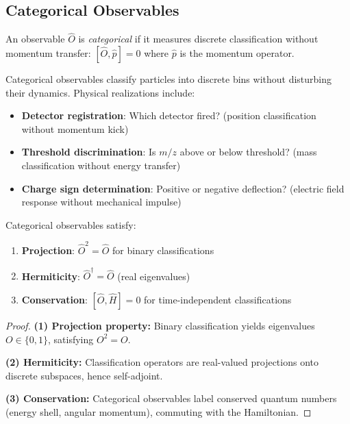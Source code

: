 \subsection{Categorical Observables}

\begin{definition}
\label{def:categorical}
An observable $\hat{O}$ is \emph{categorical} if it measures discrete classification without momentum transfer:
$
[\hat{O}, \hat{p}] = 0
$
where $\hat{p}$ is the momentum operator.
\end{definition}

Categorical observables classify particles into discrete bins without disturbing their dynamics. Physical realizations include:
\begin{itemize}
    \item \textbf{Detector registration}: Which detector fired? (position classification without momentum kick)
    \item \textbf{Threshold discrimination}: Is $m/z$ above or below threshold? (mass classification without energy transfer)
    \item \textbf{Charge sign determination}: Positive or negative deflection? (electric field response without mechanical impulse)
\end{itemize}

\begin{lemma}
\label{lem:categorical_props}
Categorical observables satisfy:
\begin{enumerate}
    \item \textbf{Projection}: $\hat{O}^2 = \hat{O}$ for binary classifications
    \item \textbf{Hermiticity}: $\hat{O}^\dagger = \hat{O}$ (real eigenvalues)
    \item \textbf{Conservation}: $[\hat{O}, \hat{H}] = 0$ for time-independent classifications
\end{enumerate}
\end{lemma}

\begin{proof}
\textbf{(1) Projection property:} Binary classification yields eigenvalues $O \in \{0, 1\}$, satisfying $O^2 = O$.

\textbf{(2) Hermiticity:} Classification operators are real-valued projections onto discrete subspaces, hence self-adjoint.

\textbf{(3) Conservation:} Categorical observables label conserved quantum numbers (energy shell, angular momentum), commuting with the Hamiltonian.
\end{proof}

